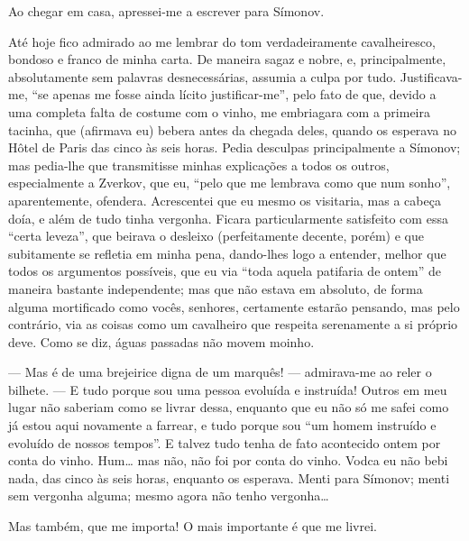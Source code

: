 Ao chegar em casa, apressei-me a escrever para Símonov.

Até hoje fico admirado ao me lembrar do tom verdadeiramente
cavalheiresco, bondoso e franco de minha carta. De maneira sagaz e
nobre, e, principalmente, absolutamente sem palavras desnecessárias,
assumia a culpa por tudo. Justificava-me, “se apenas me fosse ainda
lícito justificar-me”, pelo fato de que, devido a uma completa falta de
costume com o vinho, me embriagara com a primeira tacinha, que
(afirmava eu) bebera antes da chegada deles, quando os esperava no
Hôtel de Paris das cinco às seis horas. Pedia desculpas
principalmente a Símonov; mas pedia-lhe que transmitisse minhas
explicações a todos os outros, especialmente a Zverkov, que eu, “pelo
que me lembrava como que num sonho”, aparentemente, ofendera.
Acrescentei que eu mesmo os visitaria, mas a cabeça doía, e além de
tudo tinha vergonha. Ficara particularmente satisfeito com essa “certa
leveza”, que beirava o desleixo (perfeitamente decente, porém) e que
subitamente se refletia em minha pena, dando-lhes logo a entender,
melhor que todos os argumentos possíveis, que eu via “toda aquela
patifaria de ontem” de maneira bastante independente; mas que não
estava em absoluto, de forma alguma mortificado como vocês, senhores,
certamente estarão pensando, mas pelo contrário, via as coisas como um
cavalheiro que respeita serenamente a si próprio deve. Como se diz,
águas passadas não movem moinho.

--- Mas é de uma brejeirice digna de um marquês! --- admirava-me ao reler o
bilhete. --- E tudo porque sou uma pessoa evoluída e instruída! Outros em
meu lugar não saberiam como se livrar dessa, enquanto que eu não só me
safei como já estou aqui novamente a farrear, e tudo porque sou “um
homem instruído e evoluído de nossos tempos”. E talvez tudo tenha de
fato acontecido ontem por conta do vinho. Hum\ldots{} mas não, não foi por
conta do vinho. Vodca eu não bebi nada, das cinco às seis horas,
enquanto os esperava. Menti para Símonov; menti sem vergonha alguma;
mesmo agora não tenho vergonha\ldots{}

Mas também, que me importa! O mais importante é que me livrei.

